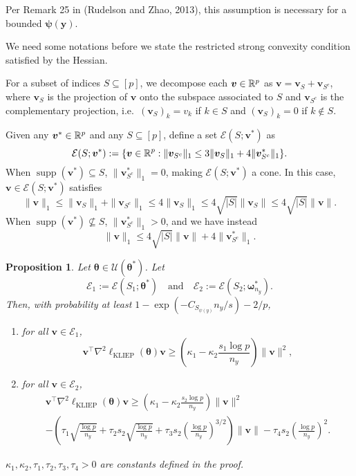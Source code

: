 \documentclass[11pt]{article}
\numberwithin{equation}{section}
\numberwithin{theorem}{section}
\DeclareMathOperator*{\supp}{supp}
\def\fatv{\boldsymbol{v}}
\def\faty{\boldsymbol{y}}
\def\fattheta{\boldsymbol{\theta}}
\def\fatpsi{\boldsymbol{\psi}}
\def\fatomega{\boldsymbol{\omega}}
\newtheorem{prop}[lem]{Proposition}
\theoremstyle{definition}
\theoremstyle{remark}
\begin{document}
\noindent
Per Remark 25 in (Rudelson and Zhao, 2013), this assumption is necessary for a bounded $\fatpsi(\faty)$.

We need some notations before we state the restricted strong convexity condition satisfied by the Hessian.

For a subset of indices $S \subseteq [p]$, we decompose each $\fatv \in \RR^p$ as $\fatv = \fatv_S + \fatv_{S^c}$, where $\fatv_S$ is the projection of $\fatv$ onto the subspace associated to $S$ and $\fatv_{S^c}$ is the complementary projection, i.e.~$(\fatv_S)_k = v_k$ if $k \in S$ and $(\fatv_S)_k = 0$ if $k \notin S$.

Given any $\fatv^* \in \RR^p$ and any $S \subseteq [p]$, define a set $\mathcal{E}(S;\fatv^*)$ as
\begin{equation}
\mathcal{E}(S;\fatv^*)
:= \{ \fatv \in \RR^p : \|\fatv_{S^c}\|_1 \leq 3 \|\fatv_S\|_1 + 4 \| \fatv_{S^c}^*\|_1 \}.
\end{equation}
When $\supp(\fatv^*) \subseteq S$, $\|\fatv_{S^c}^*\|_1 = 0$, making $\mathcal{E}(S;\fatv^*)$ a cone.
In this case, $\fatv \in \mathcal{E}(S;\fatv^*)$ satisfies
\begin{equation} \label{eq:1norm_bd_cone}
\|\fatv\|_1
\leq \|\fatv_S\|_1 + \|\fatv_{S^c}\|_1
\leq 4\|\fatv_S\|_1
\leq 4 \sqrt{|S|} \|\fatv_S\|
\leq 4 \sqrt{|S|} \|\fatv\|.
\end{equation}
When $\supp(\fatv^*) \not\subseteq S$, $\|\fatv_{S^c}^*\|_1 > 0$, and we have instead
\begin{equation} \label{eq:1norm_bd_gen}
\|\fatv\|_1
\leq 4\sqrt{|S|}\|\fatv\| + 4\|\fatv_{S^c}^*\|_1.
\end{equation}

\begin{prop}
Let $\fattheta \in \mathcal{U}(\fattheta^*)$.
Let
\begin{equation}
\mathcal{E}_1 := \mathcal{E}(S_1;\fattheta^*)
\quad \text{and} \quad
\mathcal{E}_2 := \mathcal{E}(S_2;\fatomega_{n_y}^*).
\end{equation}
Then, with probability at least $1 - \exp(-C_{S_{\psi(y)}} n_y / s) - 2 / p$,
\begin{enumerate}
\item for all $\fatv \in \mathcal{E}_1$,
\begin{equation}
\fatv^\top \nabla^2 \ell_\text{KLIEP}(\fattheta) \fatv \geq \left( \kappa_1 - \kappa_2 \frac{s_1 \log p}{n_y} \right) \|\fatv\|^2,
\end{equation}
\item for all $\fatv \in \mathcal{E}_2$,
\begin{multline}
\fatv^\top \nabla^2 \ell_\text{KLIEP}(\fattheta) \fatv
\geq \left( \kappa_1 - \kappa_2 \frac{s_2 \log p}{n_y} \right) \|\fatv\|^2 \\
- \left( \tau_1 \sqrt{\frac{\log p}{n_y}} + \tau_2 s_2 \sqrt{\frac{\log p}{n_y}} + \tau_3 s_2 \left( \frac{\log p}{n_y} \right)^{3/2} \right) \|\fatv\| - \tau_4 s_2 \left( \frac{\log p}{n_y} \right)^2.
\end{multline}
\end{enumerate}
$\kappa_1, \kappa_2, \tau_1, \tau_2, \tau_3, \tau_4 > 0$ are constants defined in the proof.
\end{prop}
\end{document}
